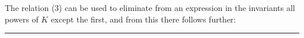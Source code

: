 
The relation (3) can be used to eliminate from an expression in the invariants all powers of $K$ except the first, and from this there follows further:

\begin{quote}
\end{quote}

\begin{center}
\rule{4cm}{0.4pt}
\end{center}
